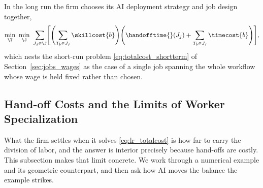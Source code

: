 In the long run the firm chooses its AI deployment strategy and job design together,
\begin{align}
\label{eq:lr_totalcost}
\min_{\T} \ \min_{\J} \
\sum_{J_j \in \J} \Biggl[\Biggl(\sum_{T_b \in J_j} \skillcost{b} \Biggr) \Biggl(\handofftime{}(J_j) + \sum_{T_b \in J_j} \timecost{b} \Biggr)\Biggr],
\end{align}
which nests the short-run problem \eqref{eq:totalcost_shortterm} of Section~\ref{sec:jobs_wages} as the case of a single job spanning the whole workflow whose wage is held fixed rather than chosen.


\subsection{Hand-off Costs and the Limits of Worker Specialization}
\label{sec:longrun.specialization}

What the firm settles when it solves \eqref{eq:lr_totalcost} is how far to carry the division of labor, and the answer is interior precisely because hand-offs are costly.
This subsection makes that limit concrete.
We work through a numerical example and its geometric counterpart, and then ask how AI moves the balance the example strikes.

